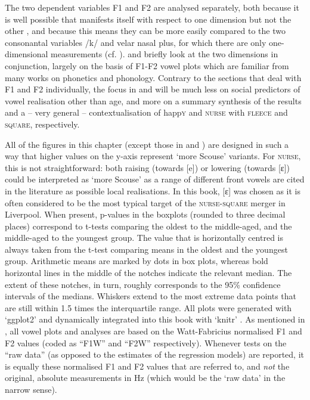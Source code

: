 \largerpage
The two dependent variables F1 and F2 are analysed separately, both because it is well possible that  manifests itself with respect to one dimension but not the other \parencite[cf.][]{harrington2006}, and because this means they can be more easily compared to the two consonantal variables /k/ and velar nasal plus, for which there are only one-dimensional measurements (cf. ).
 and  briefly look at the two dimensions in conjunction, largely on the basis of F1-F2 vowel plots which are familiar from many works on phonetics and phonology.
Contrary to the sections that deal with F1 and F2 individually, the focus in  and  will be much less on social predictors of vowel realisation other than age, and more on a summary synthesis of the  results and a -- very general -- contextualisation of happ\textsc{y} and \textsc{nurse} with \textsc{fleece} and \textsc{square}, respectively.

\largerpage
All of the figures in this chapter (except those in  and ) are designed in such a way that higher values on the y-axis represent `more Scouse' variants.
For \textsc{nurse}, this is not straightforward: both raising (towards [e]) or lowering (towards [ɛ]) could be interpreted as \enquote*{more Scouse} as a range of different front vowels are cited in the literature as possible local realisations.
In this book, [ɛ] was chosen as it is often considered to be the most typical target of the \textsc{nurse}-\textsc{square} merger in Liverpool.
When present, p-values in the boxplots (rounded to three decimal places) correspond to t-tests comparing the oldest to the middle-aged, and the middle-aged to the youngest group.
The value that is horizontally centred is always taken from the t-test comparing means in the oldest and the youngest group.
Arithmetic means are marked by dots in box plots, whereas bold horizontal lines in the middle of the notches indicate the relevant median.
The extent of these notches, in turn, roughly corresponds to the 95\% confidence intervals of the medians.
Whiskers extend to the most extreme data points that are still within 1.5 times the interquartile range.
All plots were generated with `ggplot2' \parencite{ggplot2} and dynamically integrated into this book with `knitr' \parencite{knitr}.
As mentioned in , all vowel plots and analyses are based on the Watt-Fabricius normalised F1 and F2 values (coded as ``F1W'' and ``F2W'' respectively).
Whenever tests on the ``raw data'' (as opposed to the estimates of the regression models) are reported, it is equally these normalised F1 and F2 values that are referred to, and \emph{not} the original, absolute measurements in Hz (which would be the `raw data' in the narrow sense).

